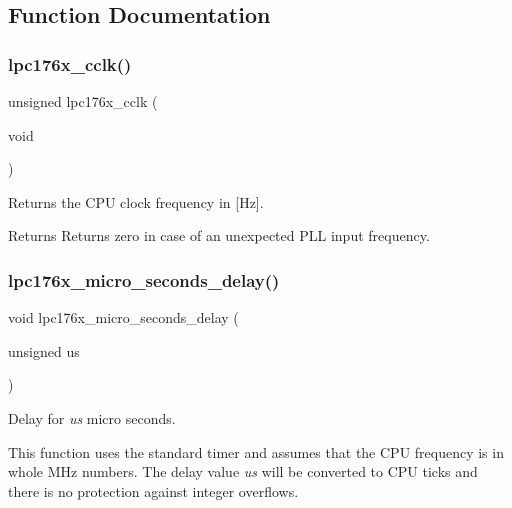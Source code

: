 \subsection{Function Documentation}
\mbox{\label{group__lpc176x__clock_gabd5c49363477314782dd3ce3521962b1}} 
\subsubsection{\texorpdfstring{lpc176x\_cclk()}{lpc176x\_cclk()}}
{\footnotesize\ttfamily unsigned lpc176x\+\_\+cclk (\begin{DoxyParamCaption}\item[{void}]{ }\end{DoxyParamCaption})}



Returns the C\+PU clock frequency in \mbox{[}Hz\mbox{]}. 

\begin{DoxyReturn}{Returns}
Returns zero in case of an unexpected P\+LL input frequency. 
\end{DoxyReturn}
\mbox{\label{group__lpc176x__clock_gac77b85bc6bddf82f57b59d4c340fbd24}} 
\subsubsection{\texorpdfstring{lpc176x\_micro\_seconds\_delay()}{lpc176x\_micro\_seconds\_delay()}}
{\footnotesize\ttfamily void lpc176x\+\_\+micro\+\_\+seconds\+\_\+delay (\begin{DoxyParamCaption}\item[{unsigned}]{us }\end{DoxyParamCaption})}



Delay for {\itshape us} micro seconds. 

This function uses the standard timer and assumes that the C\+PU frequency is in whole M\+Hz numbers. The delay value {\itshape us} will be converted to C\+PU ticks and there is no protection against integer overflows.

